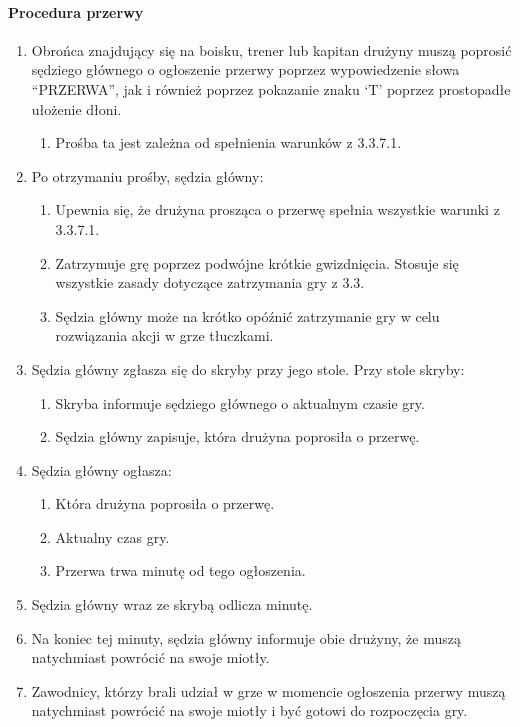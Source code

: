 \documentclass[12pt]{article}
\begin{document}
\paragraph{Procedura przerwy}

\begin{enumerate}
\item
  Obrońca znajdujący się na boisku, trener lub kapitan drużyny muszą
  poprosić sędziego głównego o ogłoszenie przerwy poprzez wypowiedzenie
  słowa ``PRZERWA'', jak i również poprzez pokazanie znaku `T' poprzez
  prostopadłe ułożenie dłoni.

  \begin{enumerate}
  \item
        Prośba ta jest zależna od spełnienia warunków z 3.3.7.1.
      \end{enumerate}
\item
  Po otrzymaniu prośby, sędzia główny:

  \begin{enumerate}
  \item
        Upewnia się, że drużyna prosząca o przerwę spełnia wszystkie warunki
    z 3.3.7.1.
      \item
        Zatrzymuje grę poprzez podwójne krótkie gwizdnięcia. Stosuje się
    wszystkie zasady dotyczące zatrzymania gry z 3.3.
      \item
        Sędzia główny może na krótko opóźnić zatrzymanie gry w celu
    rozwiązania akcji w grze tłuczkami.
      \end{enumerate}
\item
  Sędzia główny zgłasza się do skryby przy jego stole. Przy stole
  skryby:

  \begin{enumerate}
  \item
        Skryba informuje sędziego głównego o aktualnym czasie gry.
      \item
        Sędzia główny zapisuje, która drużyna poprosiła o przerwę.
      \end{enumerate}
\item
  Sędzia główny ogłasza:

  \begin{enumerate}
  \item
        Która drużyna poprosiła o przerwę.
      \item
        Aktualny czas gry.
      \item
        Przerwa trwa minutę od tego ogłoszenia.
      \end{enumerate}
\item
  Sędzia główny wraz ze skrybą odlicza minutę.
\item
  Na koniec tej minuty, sędzia główny informuje obie drużyny, że muszą
  natychmiast powrócić na swoje miotły.
\item
  Zawodnicy, którzy brali udział w grze w momencie ogłoszenia przerwy
  muszą natychmiast powrócić na swoje miotły i być gotowi do rozpoczęcia
  gry.


\end{enumerate}
\end{document}
